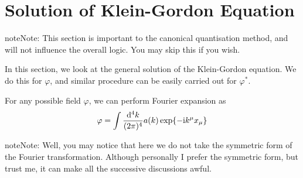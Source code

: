 \documentclass[letterpaper,10pt,english]{sphinxmanual}
\begin{document}
\section{Solution of Klein-Gordon Equation}
\label{\detokenize{clstheo_kgeq::doc}}\label{\detokenize{clstheo_kgeq:solution-of-klein-gordon-equation}}
\begin{sphinxadmonition}{note}{Note:}
This section is important to the canonical quantisation method, and will not influence the overall logic. You may skip this if you wish.
\end{sphinxadmonition}

In this section, we look at the general solution of the Klein-Gordon equation. We do this for \(\varphi\), and similar procedure can be easily carried out for \(\varphi^*\).

For any possible field \(\varphi\), we can perform Fourier expansion as
\begin{equation*}
\begin{split}\varphi = \int{\mathrm d^4k\over(2\pi)^4}a(k)\exp\{-\mathrm i k^\mu x_\mu\}\end{split}
\end{equation*}
\begin{sphinxadmonition}{note}{Note:}
Well, you may notice that here we do not take the symmetric form of the Fourier transformation. Although personally I prefer the symmetric form, but trust me, it can make all the successive discussions awful.
\end{sphinxadmonition}
\end{document}
